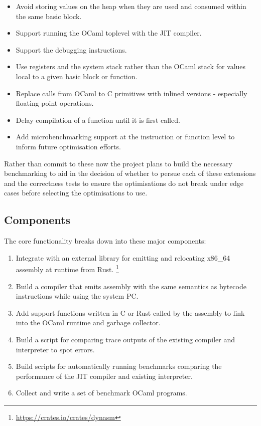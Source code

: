 \documentclass[12pt,a4paper, headings=standardclasses]{scrartcl}
\begin{document}
\begin{itemize}
      \item Avoid storing values on the heap when they are used and consumed
            within the same basic block.
      \item Support running the OCaml toplevel with the JIT compiler.
      \item Support the debugging instructions.
      \item Use registers and the system stack rather than the OCaml stack
            for values local to a given basic block or function.
      \item Replace calls from OCaml to C primitives with inlined versions -
            especially floating point operations.
      \item Delay compilation of a function until it is first called.
      \item Add microbenchmarking support at the instruction or function
            level to inform future optimisation efforts.
\end{itemize}

Rather than commit to these now the project plans to build the necessary benchmarking
to aid in the decision of whether to persue each of these extensions and the correctness
tests to ensure the optimisations do not break under edge cases before selecting the
optimisations to use.

\subsection*{Components}

The core functionality breaks down into these major components:

\begin{enumerate}
      \item Integrate with an external library for emitting and relocating
            x86\_64 assembly at runtime from Rust.
            \footnote{\url{https://crates.io/crates/dynasm}}
      \item Build a compiler that emits assembly with the same semantics as
            bytecode instructions while using the system PC.
      \item Add support functions written in C or Rust called by the assembly
            to link into the OCaml runtime and garbage collector.
      \item Build a script for comparing trace outputs of the existing
            compiler and interpreter to spot errors.
      \item Build scripts for automatically running benchmarks comparing the
            performance of the JIT compiler and existing interpreter.
      \item Collect and write a set of benchmark OCaml programs.
\end{enumerate}
\end{document}
